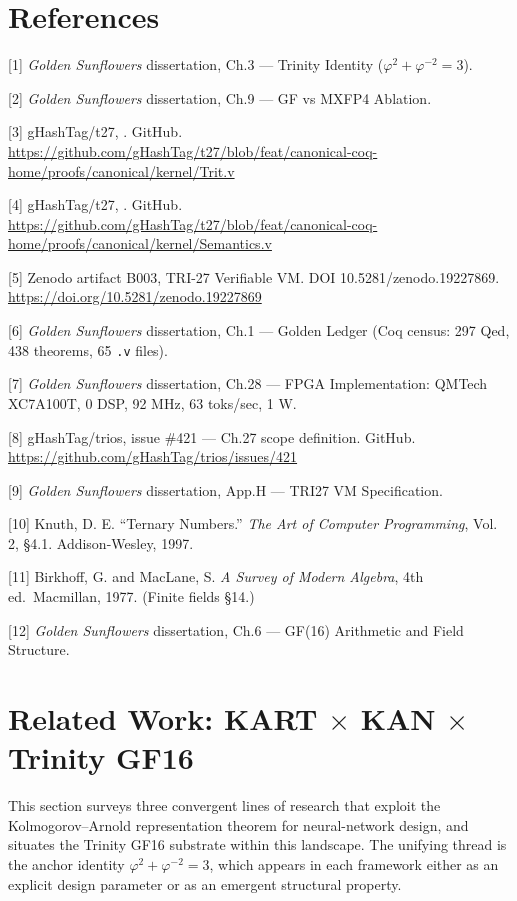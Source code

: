 \section{References}\label{fa_27:references}

[1] \emph{Golden Sunflowers} dissertation,
Ch.3 --- Trinity Identity
(\(\varphi^2 + \varphi^{-2} = 3\)).

[2] \emph{Golden Sunflowers} dissertation,
Ch.9 --- GF vs MXFP4 Ablation.

[3] gHashTag/t27,
. GitHub.
\url{https://github.com/gHashTag/t27/blob/feat/canonical-coq-home/proofs/canonical/kernel/Trit.v}

[4] gHashTag/t27,
.
GitHub.
\url{https://github.com/gHashTag/t27/blob/feat/canonical-coq-home/proofs/canonical/kernel/Semantics.v}

[5] Zenodo artifact B003, TRI-27 Verifiable
VM. DOI 10.5281/zenodo.19227869.
\url{https://doi.org/10.5281/zenodo.19227869}

[6] \emph{Golden Sunflowers} dissertation,
Ch.1 --- Golden Ledger (Coq census: 297 Qed, 438
theorems, 65 \texttt{.v} files).

[7] \emph{Golden Sunflowers} dissertation,
Ch.28 --- FPGA Implementation: QMTech XC7A100T, 0
DSP, 92 MHz, 63 toks/sec, 1 W.

[8] gHashTag/trios, issue \#421 --- Ch.27
scope definition. GitHub.
\url{https://github.com/gHashTag/trios/issues/421}

[9] \emph{Golden Sunflowers} dissertation,
App.H --- TRI27 VM Specification.

[10] Knuth, D. E. ``Ternary Numbers.''
\emph{The Art of Computer Programming}, Vol. 2,
§4.1. Addison-Wesley, 1997.

[11] Birkhoff, G. and MacLane, S. \emph{A
Survey of Modern Algebra}, 4th ed.~Macmillan,
1977. (Finite fields §14.)

[12] \emph{Golden Sunflowers} dissertation,
Ch.6 --- GF(16) Arithmetic and Field Structure.

\section{Related Work: KART $\times$ KAN $\times$ Trinity
GF16}\label{fa_27:related-work-kart-kan-trinity}

This section surveys three convergent lines of
research that exploit the Kolmogorov--Arnold
representation theorem for neural-network design,
and situates the Trinity GF16 substrate within this
landscape. The unifying thread is the anchor
identity \(\varphi^2 + \varphi^{-2} = 3\), which
appears in each framework either as an explicit
design parameter or as an emergent structural
property.

